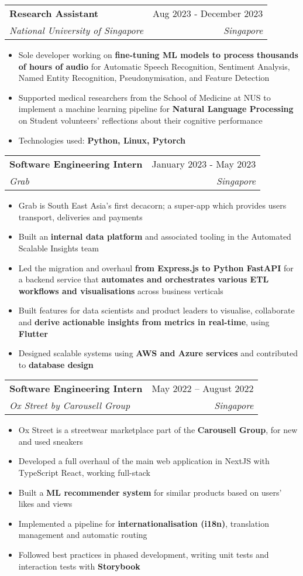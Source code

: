 \documentclass[letterpaper,11pt]{article}
\makeatletter
\newcommand{\resumeItem}[1]{
  \item\small{
    {#1 \vspace{-2pt}}
  }
}
\newcommand{\resumeSubheading}[4]{
  \vspace{-2pt}\item
    \begin{tabular*}{0.97\textwidth}[t]{l@{\extracolsep{\fill}}r}
      \textbf{#1} & #2 \\
      \textit{\small#3} & \textit{\small #4} \\
    \end{tabular*}\vspace{-7pt}
}
\newcommand{\resumeItemListStart}{\begin{itemize}}
\newcommand{\resumeItemListEnd}{\end{itemize}\vspace{-5pt}}
\makeatother
\begin{document}
    \resumeSubheading
    {Research Assistant}{Aug 2023 - December 2023}
    {National University of Singapore}{Singapore}
    \resumeItemListStart
    \resumeItem{Sole developer working on \textbf{fine-tuning ML models to process thousands of hours of audio} for Automatic Speech Recognition, Sentiment Analysis, Named Entity Recognition, Pseudonymisation, and Feature Detection}
    \resumeItem{Supported medical researchers from the School of Medicine at NUS to implement a machine learning pipeline for \textbf{Natural Language Processing} on Student volunteers' reflections about their cognitive performance}
    \resumeItem{Technologies used: \textbf{Python, Linux, Pytorch}}
    \resumeItemListEnd

    \resumeSubheading
    {Software Engineering Intern}{January 2023 - May 2023}
    {Grab}{Singapore}
    \resumeItemListStart
    \resumeItem{Grab is South East Asia's first decacorn; a super-app which provides users transport, deliveries and payments}
    \resumeItem{Built an \textbf{internal data platform} and associated tooling in the Automated Scalable Insights team}
    \resumeItem{Led the migration and overhaul \textbf{from Express.js to Python FastAPI} for a backend service that \textbf{automates and orchestrates various ETL workflows and visualisations} across business verticals}
    \resumeItem{Built features for data scientists and product leaders to visualise, collaborate and \textbf{derive actionable insights from metrics in real-time}, using \textbf{Flutter}}
    \resumeItem{Designed scalable systems using \textbf{AWS and Azure services} and contributed to \textbf{database design}}
    \resumeItemListEnd

    \resumeSubheading
      {Software Engineering Intern}{May 2022 -- August 2022}
      {Ox Street by Carousell Group}{Singapore}
      \resumeItemListStart
        \resumeItem{Ox Street is a streetwear marketplace part of the \textbf{Carousell Group}, for new and used sneakers}
        \resumeItem{Developed a full overhaul of the main web application in NextJS with TypeScript React, working full-stack}
        \resumeItem{Built a \textbf{ML recommender system} for similar products based on users' likes and views}
        \resumeItem{Implemented a pipeline for \textbf{internationalisation (i18n)}, translation management and automatic routing}
        \resumeItem{Followed best practices in phased development, writing unit tests and interaction tests with \textbf{Storybook}}
      \resumeItemListEnd
\end{document}
